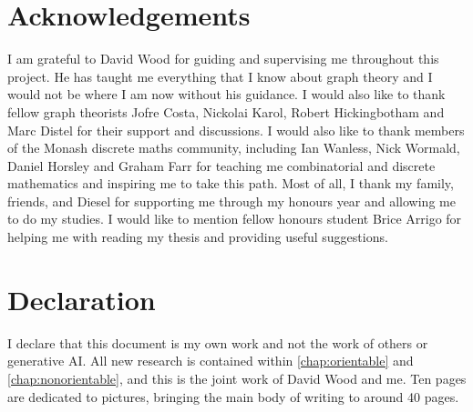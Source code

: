 \section*{Acknowledgements}
I am grateful to David Wood for guiding and supervising me throughout this project. He has taught me everything that I know about graph theory and I would not be where I am now without his guidance. I would also like to thank fellow graph theorists Jofre Costa, Nickolai Karol, Robert Hickingbotham and Marc Distel for their support and discussions. I would also like to thank members of the Monash discrete maths community, including Ian Wanless, Nick Wormald, Daniel Horsley and Graham Farr for teaching me combinatorial and discrete mathematics and inspiring me to take this path. Most of all, I thank my family, friends, and Diesel for supporting me through my honours year and allowing me to do my studies. I would like to mention fellow honours student Brice Arrigo for helping me with reading my thesis and providing useful suggestions.

\section*{Declaration}

I declare that this document is my own work and not the work of others or generative AI. All new research is contained within \cref{chap:orientable} and \cref{chap:nonorientable}, and this is the joint work of David Wood and me. Ten pages are dedicated to pictures, bringing the main body of writing to around 40 pages. 